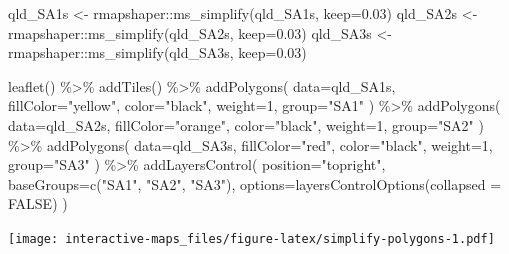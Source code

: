 \documentclass[
]{book}
\newenvironment{Shaded}{\begin{snugshade}}{\end{snugshade}}
\newcommand{\AttributeTok}[1]{\textcolor[rgb]{0.77,0.63,0.00}{#1}}
\newcommand{\ConstantTok}[1]{\textcolor[rgb]{0.00,0.00,0.00}{#1}}
\newcommand{\DecValTok}[1]{\textcolor[rgb]{0.00,0.00,0.81}{#1}}
\newcommand{\FloatTok}[1]{\textcolor[rgb]{0.00,0.00,0.81}{#1}}
\newcommand{\FunctionTok}[1]{\textcolor[rgb]{0.00,0.00,0.00}{#1}}
\newcommand{\NormalTok}[1]{#1}
\newcommand{\OtherTok}[1]{\textcolor[rgb]{0.56,0.35,0.01}{#1}}
\newcommand{\SpecialCharTok}[1]{\textcolor[rgb]{0.00,0.00,0.00}{#1}}
\newcommand{\StringTok}[1]{\textcolor[rgb]{0.31,0.60,0.02}{#1}}
\begin{document}
\begin{Shaded}
\begin{Highlighting}[]
\NormalTok{qld\_SA1s }\OtherTok{\textless{}{-}}\NormalTok{ rmapshaper}\SpecialCharTok{::}\FunctionTok{ms\_simplify}\NormalTok{(qld\_SA1s, }\AttributeTok{keep=}\FloatTok{0.03}\NormalTok{)}
\NormalTok{qld\_SA2s }\OtherTok{\textless{}{-}}\NormalTok{ rmapshaper}\SpecialCharTok{::}\FunctionTok{ms\_simplify}\NormalTok{(qld\_SA2s, }\AttributeTok{keep=}\FloatTok{0.03}\NormalTok{)}
\NormalTok{qld\_SA3s }\OtherTok{\textless{}{-}}\NormalTok{ rmapshaper}\SpecialCharTok{::}\FunctionTok{ms\_simplify}\NormalTok{(qld\_SA3s, }\AttributeTok{keep=}\FloatTok{0.03}\NormalTok{)}

\FunctionTok{leaflet}\NormalTok{() }\SpecialCharTok{\%\textgreater{}\%}
  \FunctionTok{addTiles}\NormalTok{() }\SpecialCharTok{\%\textgreater{}\%}
  \FunctionTok{addPolygons}\NormalTok{(}
    \AttributeTok{data=}\NormalTok{qld\_SA1s,}
    \AttributeTok{fillColor=}\StringTok{"yellow"}\NormalTok{,}
    \AttributeTok{color=}\StringTok{"black"}\NormalTok{,}
    \AttributeTok{weight=}\DecValTok{1}\NormalTok{,}
    \AttributeTok{group=}\StringTok{"SA1"}
\NormalTok{  ) }\SpecialCharTok{\%\textgreater{}\%}
  \FunctionTok{addPolygons}\NormalTok{(}
    \AttributeTok{data=}\NormalTok{qld\_SA2s,}
    \AttributeTok{fillColor=}\StringTok{"orange"}\NormalTok{,}
    \AttributeTok{color=}\StringTok{"black"}\NormalTok{,}
    \AttributeTok{weight=}\DecValTok{1}\NormalTok{,}
    \AttributeTok{group=}\StringTok{"SA2"}
\NormalTok{  ) }\SpecialCharTok{\%\textgreater{}\%}
  \FunctionTok{addPolygons}\NormalTok{(}
    \AttributeTok{data=}\NormalTok{qld\_SA3s,}
    \AttributeTok{fillColor=}\StringTok{"red"}\NormalTok{,}
    \AttributeTok{color=}\StringTok{"black"}\NormalTok{,}
    \AttributeTok{weight=}\DecValTok{1}\NormalTok{,}
    \AttributeTok{group=}\StringTok{"SA3"}
\NormalTok{  ) }\SpecialCharTok{\%\textgreater{}\%}
  \FunctionTok{addLayersControl}\NormalTok{(}
    \AttributeTok{position=}\StringTok{"topright"}\NormalTok{,}
    \AttributeTok{baseGroups=}\FunctionTok{c}\NormalTok{(}\StringTok{"SA1"}\NormalTok{, }\StringTok{"SA2"}\NormalTok{, }\StringTok{"SA3"}\NormalTok{),}
    \AttributeTok{options=}\FunctionTok{layersControlOptions}\NormalTok{(}\AttributeTok{collapsed =} \ConstantTok{FALSE}\NormalTok{)}
\NormalTok{  )}
\end{Highlighting}
\end{Shaded}

\texttt{[image: interactive-maps\_files/figure-latex/simplify-polygons-1.pdf]}
\end{document}

